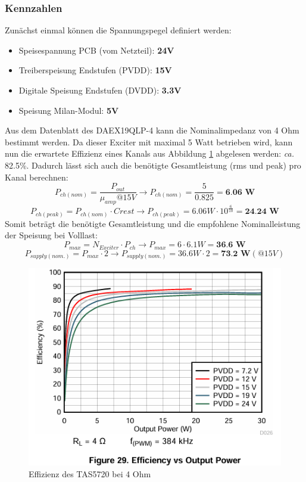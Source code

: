 \subsubsection{Kennzahlen}
Zunächst einmal können die Spannungspegel definiert werden: 
\begin{itemize}
	\item Speisespannung PCB (vom Netzteil): \textbf{24V}
	\item Treiberspeisung Endstufen (PVDD): \textbf{15V}
	\item Digitale Speisung Endstufen (DVDD): \textbf{3.3V}
	\item Speisung Milan-Modul: \textbf{5V}
\end{itemize}
Aus dem Datenblatt des DAEX19QLP-4 \cite{DAEX19QLP4spec} kann die Nominalimpedanz von 4 Ohm bestimmt werden. Da dieser Exciter mit maximal 5 Watt betrieben wird, kann nun die erwartete Effizienz eines Kanals aus Abbildung \ref{pics:tas5720_efficiency_4ohm} abgelesen werden: \textit{ca.} 82.5\%. Dadurch lässt sich auch die benötigte Gesamtleistung (rms und peak) pro Kanal berechnen:
\begin{equation}
	P_{ch(nom)} = \frac{P_{out}}{\mu_{amp} @ 15V} \rightarrow P_{ch(nom)} = \frac{5}{0.825} = \textbf{6.06 W}
	\label{eq:pwr_per_channel_rms}
\end{equation}
\begin{equation}
	P_{ch(peak)} = P_{ch(nom)} \cdot Crest \rightarrow P_{ch(peak)} = 6.06W \cdot 10^{\frac{6}{10}} = \textbf{24.24 W}
	\label{eq:pwr_per_channel_peak}
\end{equation}
Somit beträgt die benötigte Gesamtleistung und die empfohlene Nominalleistung der Speisung bei Volllast:
\begin{equation}
	P_{max} = N_{Exciter} \cdot P_{ch} \rightarrow P_{max} = 6 \cdot 6.1 W = \textbf{36.6 W}
\end{equation}
\begin{equation}
	P_{supply(nom.)} = P_{max} \cdot 2 \rightarrow P_{supply(nom.)} = 36.6W \cdot 2 = \textbf{73.2 W} (@ 15V)
\end{equation}
\begin{figure}[H]
	\centering
	\includegraphics[width = \textwidth*1/2]{pictures/tas5720l_efficiency_4Ohms.png}
	\caption{Effizienz des TAS5720 bei 4 Ohm}
	\label{pics:tas5720_efficiency_4ohm}
\end{figure}
